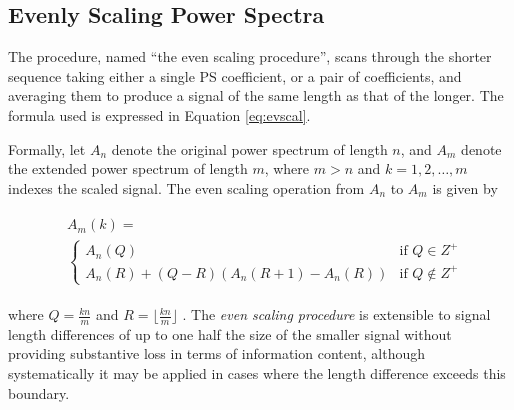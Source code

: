 \documentclass[10pt,conference]{IEEEtran}
\begin{document}
\subsection{Evenly Scaling Power Spectra} 
\noindent  The procedure, named ``the even scaling procedure'',  
scans through the shorter sequence taking either a single PS coefficient, or a pair of coefficients, and 
averaging them to produce a signal of the same length as that of the longer.  
The formula used is expressed in Equation \ref{eq:evscal}. 

Formally, let $A_n$ denote the original power spectrum of length $n$, and $A_m$ denote the extended power spectrum of length $m$, where $m > n$ and $k=1,2,\dots,m$ indexes the scaled signal. The even scaling operation from $A_n$ to $A_m$ is given by

\begin{align}
\begin{split}
&A_m(k)=\\
&\begin{cases} A_n(Q) & \mbox{if } Q\in Z^+\\
 A_n(R) + (Q-R)(A_n(R+1)-A_n(R)) & \mbox{if } Q  \notin Z^+
\end{cases}
\label{eq:evscal}
\end{split}
\end{align}


\noindent where $Q = \frac{kn}{m}$ and $R = \lfloor \frac{kn}{m} \rfloor$ \cite{yin15}. The \textit{even scaling procedure} is extensible to signal length differences of up to one half the size of the smaller signal without providing substantive loss in terms of information content, although systematically it may be applied in cases where the length difference exceeds this boundary.
\end{document}
